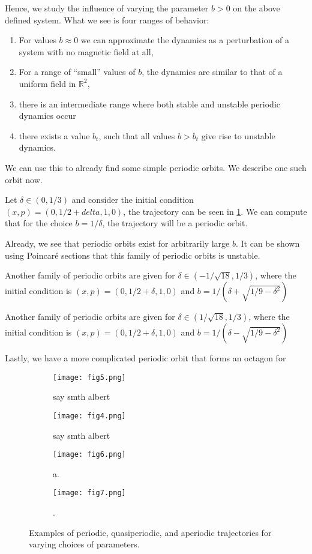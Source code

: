 Hence, we study the influence of varying the parameter $b>0$ on the above defined system. What we see is four ranges of behavior:
\begin{enumerate}
\item For values $b\approx0$ we can approximate the dynamics as a perturbation of a system with no magnetic field at all,
\item For a range of ``small'' values of $b$, the dynamics are similar to that of a uniform field in $\mathbb R^2$,
\item there is an intermediate range where both stable and unstable periodic dynamics occur
\item there exists a value $b_t$, such that all values $b>b_t$ give rise to unstable dynamics.
\end{enumerate}

We can use this to already find some simple periodic orbits. We describe one such orbit now.

Let $\delta\in(0,1/3)$ and consider the initial condition $(x,p) = (0,1/2+delta,1,0)$, the trajectory can be seen in \cref{subfig:periodicorbit1}. We can compute that for the choice $b=1/\delta$, the trajectory will be a periodic orbit.

Already, we see that periodic orbits exist for arbitrarily large $b$. It can be shown using Poincar\'e sections that this family of periodic orbits is unstable.

Another family of periodic orbits are given for $\delta\in(-1/\sqrt{18},1/3)$, where the initial condition is $(x,p)=(0,1/2+\delta,1,0)$ and $b = 1/(\delta+\sqrt{1/9-\delta^2})$

Another family of periodic orbits are given for $\delta\in(1/\sqrt{18},1/3)$, where the initial condition is $(x,p)=(0,1/2+\delta,1,0)$ and $b = 1/(\delta-\sqrt{1/9-\delta^2})$

Lastly, we have a more complicated periodic orbit that forms an octagon for 


\begin{figure}[!th]
\centering
\begin{subfigure}{0.49\textwidth}
\centering
\texttt{[image: fig5.png]}
\caption{say smth albert}
\label{subfig:periodicorbit1}
\end{subfigure}
%
\begin{subfigure}{0.49\textwidth}
\texttt{[image: fig4.png]}
\caption{say smth albert}
\label{subfig:periodicorbit2}
\end{subfigure}
%
\begin{subfigure}{0.49\textwidth}
\texttt{[image: fig6.png]}
\caption{a.}
\label{subfig:periodicorbit3}
\end{subfigure}
%
\begin{subfigure}{0.49\textwidth}
\texttt{[image: fig7.png]}
\caption{.}
\label{subfig:periodicorbit4}
\end{subfigure}
\caption{Examples of periodic, quasiperiodic, and aperiodic trajectories for varying choices of parameters.}
\label{fig:periodicorbits}
\end{figure}

\color{black}